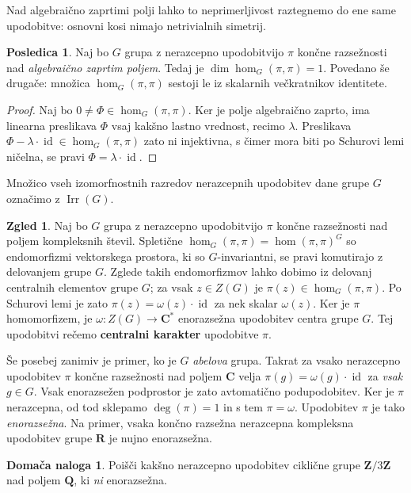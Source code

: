 \documentclass[11pt]{book}
\def\ZZ{\mathbf{Z}}
\def\QQ{\mathbf{Q}}
\def\RR{\mathbf{R}}
\def\CC{\mathbf{C}}
\DeclareMathOperator\Irr{Irr}
\DeclareMathOperator\id{id}
\def\definicija{\color{rdeca}\bf}
\theoremstyle{definition}
\theoremstyle{zgled}
\newtheorem{zgled}[theorem]{Zgled}
\theoremstyle{zgledbrezstevilke}
\theoremstyle{odprtproblem}
\theoremstyle{domacanaloga}
\newtheorem{domacanaloga}[theorem]{Domača naloga}
\newenvironment{dokaz}
    {\color{siva}\begin{proof}}
    {\end{proof}}
\theoremstyle{izrek}
\newtheorem{posledica}[theorem]{Posledica}
\begin{document}
Nad algebraično zaprtimi polji lahko to neprimerljivost raztegnemo do ene same upodobitve: osnovni kosi nimajo netrivialnih simetrij.

\begin{posledica}
Naj bo $G$ grupa z nerazcepno upodobitvijo $\pi$ končne razsežnosti nad \emph{algebraično zaprtim poljem}. Tedaj je $\dim \hom_G(\pi, \pi) = 1$. Povedano še drugače: množica $\hom_G(\pi, \pi)$ sestoji le iz skalarnih večkratnikov identitete.
\end{posledica}
\begin{dokaz}
Naj bo $0 \neq \Phi \in \hom_G(\pi, \pi)$. Ker je polje algebraično zaprto, ima linearna preslikava $\Phi$ vsaj kakšno lastno vrednost, recimo $\lambda$. Preslikava $\Phi - \lambda \cdot \id \in \hom_G(\pi, \pi)$ zato ni injektivna, s čimer mora biti po Schurovi lemi ničelna, se pravi $\Phi = \lambda \cdot \id$.
\end{dokaz}

Množico vseh izomorfnostnih razredov nerazcepnih upodobitev dane grupe $G$ označimo z $\Irr(G)$.

\begin{zgled}
Naj bo $G$ grupa z nerazcepno upodobitvijo $\pi$ končne razsežnosti nad poljem kompleksnih števil. Spletične $\hom_G(\pi, \pi) = \hom(\pi, \pi)^G$ so endomorfizmi vektorskega prostora, ki so $G$-invariantni, se pravi komutirajo z delovanjem grupe $G$. Zglede takih endomorfizmov lahko dobimo iz delovanj centralnih elementov grupe $G$; za vsak $z \in Z(G)$ je $\pi(z) \in \hom_G(\pi, \pi)$. Po Schurovi lemi je zato $\pi(z) = \omega(z) \cdot \id$ za nek skalar $\omega(z)$. Ker je $\pi$ homomorfizem, je $\omega \colon Z(G) \to \CC^*$ enorazsežna upodobitev centra grupe $G$. Tej upodobitvi rečemo {\definicija centralni karakter} upodobitve $\pi$.

Še posebej zanimiv je primer, ko je $G$ \emph{abelova} grupa. Takrat za vsako nerazcepno upodobitev $\pi$ končne razsežnosti nad poljem $\CC$ velja $\pi(g) = \omega(g) \cdot \id$ za \emph{vsak} $g \in G$.  Vsak enorazsežen podprostor je zato avtomatično podupodobitev. Ker je $\pi$ nerazcepna, od tod sklepamo $\deg(\pi) = 1$ in s tem $\pi = \omega$. Upodobitev $\pi$ je tako \emph{enorazsežna}. Na primer, vsaka končno razsežna nerazcepna kompleksna upodobitev grupe $\RR$ je nujno enorazsežna.
\end{zgled}

\begin{domacanaloga}
Poišči kakšno nerazcepno upodobitev ciklične grupe $\ZZ/3\ZZ$ nad poljem $\QQ$, ki \emph{ni} enorazsežna.
\end{domacanaloga}
\end{document}
